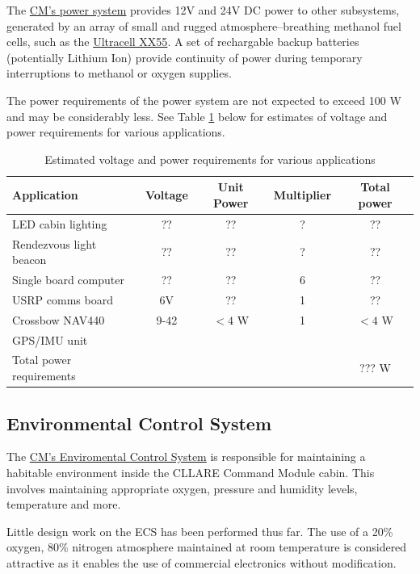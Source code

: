 \documentclass{report}
\begin{document}
The \href{http://cstart.org/wiki/CLLARE_CM_Power_System}{CM's power system} provides 12V and 24V DC power to other subsystems, generated by an array of small and rugged atmosphere--breathing methanol fuel cells, such as the \href{http://www.ultracellpower.com/assets/XX55_Data_Sheet_01-27-2009.pdf}{Ultracell XX55}.  A set of rechargable backup batteries (potentially Lithium Ion) provide continuity of power during temporary interruptions to methanol or oxygen supplies.

The power requirements of the power system are not expected to exceed 100 W and may be considerably less.  See Table \ref{tab:voltage_power} below for estimates of voltage and power requirements for various applications.

\begin{table}
\centering
\caption{Estimated voltage and power requirements for various applications}
\label{tab:voltage_power}
\begin{tabular}{ | l | c | c | c | c | }
\hline
Application & Voltage & Unit Power & Multiplier & Total power \\
\hline
\hline
LED cabin lighting & ?? & ?? & ? & ?? \\
\hline
Rendezvous light beacon & ?? & ?? & ? & ?? \\
\hline
Single board computer & ?? & ?? & 6 & ?? \\
\hline
USRP comms board & 6V & ?? & 1 & ?? \\
\hline
Crossbow NAV440 & 9-42 & $<4$ W & 1 & $<4$ W \\
GPS/IMU unit & & & & \\
\hline
\hline
Total power requirements & & & & ??? W \\
\hline
\end{tabular}
\end{table}

\subsection{Environmental Control System}

The \href{http://cstart.org/wiki/CLLARE_Environmental_Control_System}{CM's Enviromental Control System} is responsible for maintaining a habitable environment inside the CLLARE Command Module cabin. This involves maintaining appropriate oxygen, pressure and humidity levels, temperature and more.

Little design work on the ECS has been performed thus far.  The use of a 20\% oxygen, 80\% nitrogen atmosphere maintained at room temperature is considered attractive as it enables the use of commercial electronics without modification.
\end{document}

